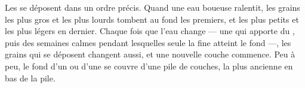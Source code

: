 Les  se déposent dans un ordre précis. Quand une eau boueuse
ralentit, les grains les plus gros et les plus lourds tombent au fond les
premiers, et les plus petits et les plus légers en dernier. Chaque fois que
l'eau change --- une  qui apporte du , puis des semaines calmes
pendant lesquelles seule la  fine atteint le fond ---, les grains qui
se déposent changent aussi, et une nouvelle couche commence. Peu à peu, le
fond d'un  ou d'une  se couvre d'une pile de couches, la plus
ancienne en bas de la pile.

